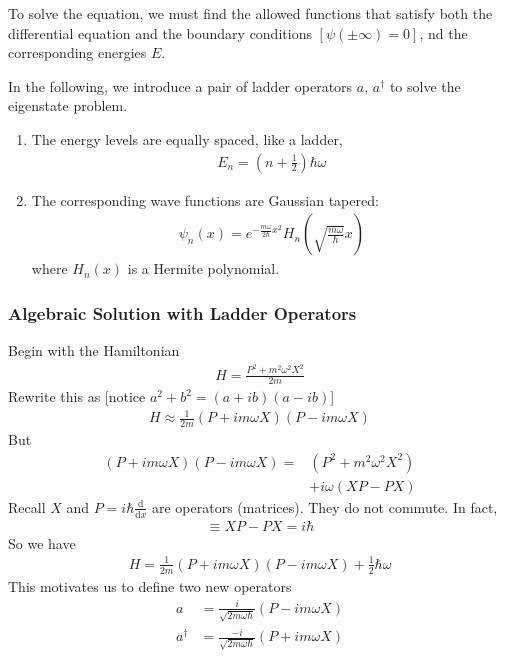 To solve the equation, we must find the allowed functions that satisfy both the differential equation and the boundary conditions $[\psi(\pm \infty)=0]$, nd the corresponding energies $E$.

In the following, we introduce a pair of ladder operators $a$, $a^\dagger$ to solve the eigenstate problem.
\begin{enumerate}
    \item The energy levels are equally spaced, like a ladder,
    \begin{align*}
        E_n=\left( n+\frac{1}{2} \right)\hbar\omega
    \end{align*}
    \item The corresponding wave functions are Gaussian tapered:
    \begin{align*}
        \psi_n(x)=e^{-\frac{m\omega}{2\hbar}x^2}H_n\left( \sqrt{\frac{m\omega}{\hbar}}x \right)
    \end{align*}
    where $H_n(x )$ is a Hermite polynomial. 
\end{enumerate}

\subsubsection{Algebraic Solution with Ladder Operators}
Begin with the Hamiltonian
\begin{align*}
    H=\frac{P^2+m^2\omega^2X^2}{2m}
\end{align*}
Rewrite this as [notice $a^2+b^2=(a+ib)(a-ib)$]
\begin{align*}
    H\approx\frac{1}{2m}(P+im\omega X)(P-im\omega X)
\end{align*}
But
\begin{align*}
    (P+im\omega X)(P-im\omega X)=&(P^2+m^2\omega^2 X^2)\\
    &+i\omega(XP-PX)
\end{align*}
Recall $X$ and $P = i\hbar \frac{\mathrm{d}}{\mathrm{d}x}$ are operators (matrices). They do not commute. In fact,
\begin{align*}
    [X,\ P]\equiv XP-PX=i\hbar
\end{align*}
So we have
\begin{align*}
    H=\frac{1}{2m}(P+im\omega X)(P-im\omega X)+\frac{1}{2}\hbar\omega
\end{align*}
This motivates us to define two new operators
\begin{align*}
    a&= \frac{i}{\sqrt{2m\omega\hbar}}(P-im\omega X)\\
    a^\dagger&=\frac{-i}{\sqrt{2m\omega\hbar}}(P+im\omega X)
\end{align*}

